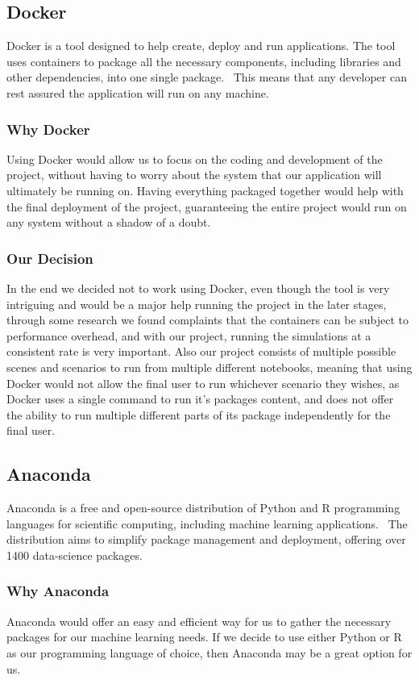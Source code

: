 \subsection{Docker}
Docker is a tool designed to help create, deploy and run applications. The tool uses containers to package all the necessary components, including libraries and other dependencies, into one single package.~\cite{dock} This means that any developer can rest assured the application will run on any machine.

\subsubsection{Why Docker}
Using Docker would allow us to focus on the coding and development of the project, without having to worry about the system that our application will ultimately be running on. Having everything packaged together would help with the final deployment of the project, guaranteeing the entire project would run on any system without a shadow of a doubt.~\cite{dockGS}

\subsubsection{Our Decision}
In the end we decided not to work using Docker, even though the tool is very intriguing and would be a major help running the project in the later stages, through some research we found complaints that the containers can be subject to performance overhead, and with our project, running the simulations at a consistent rate is very important. Also our project consists of multiple possible scenes and scenarios to run from multiple different notebooks, meaning that using Docker would not allow the final user to run whichever scenario they wishes, as Docker uses a single command to run it’s packages content, and does not offer the ability to run multiple different parts of its package independently for the final user.

\subsection{Anaconda}
Anaconda is a free and open-source distribution of Python and R programming languages for scientific computing, including machine learning applications.~\cite{anac} The distribution aims to simplify package management and deployment, offering over 1400 data-science packages.

\subsubsection{Why Anaconda}
Anaconda would offer an easy and efficient way for us to gather the necessary packages for our machine learning needs. If we decide to use either Python or R as our programming language of choice, then Anaconda may be a great option for us.~\cite{anacWhy}

